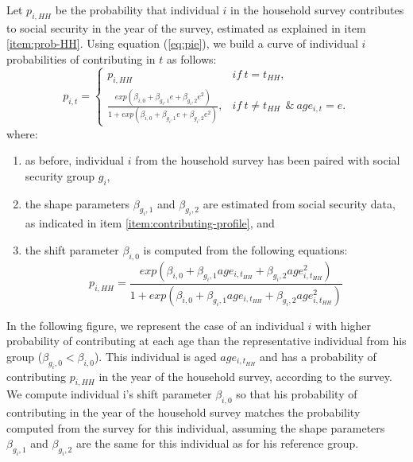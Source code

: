 \documentclass{article}
\begin{document}
\begin{enumerate}
    Let $p_{i,HH}$ be the probability that individual $i$ in the household survey contributes to social security in the year of the survey, estimated as explained in item \ref{item:prob-HH}. Using equation (\ref{eq:pie}), we build a curve of individual $i$ probabilities of contributing in $t$ as follows:
    \begin{equation}
        p_{i,t}= \left\{\begin{array}{ll}
            p_{i,HH} & if \ t = t_{HH}, \\
            \frac{exp(\beta_{i,0} +\beta_{g_i,1} e+\beta_{g_i,2} e^2)}{1+ exp(\beta_{i,0} +\beta_{g_i,1} e+\beta_{g_i,2} e^2)},&  if  \ t \neq t_{HH} \ \ \& \ age_{i,t}=e. 
        \end{array} \right .
    \end{equation}
    where: 
    \begin{enumerate}
        \item as before, individual $i$ from the household survey has been paired with social security group $g_i$,
        \item the shape parameters $\beta_{g_i,1}$ and $\beta_{g_i,2}$ are estimated from social security data, as indicated in item \ref{item:contributing-profile}, and
        \item the shift parameter $\beta_{i,0}$ is computed from the following equations: 
        \begin{equation} \label{eq:piHH}
         p_{i,HH}=\frac{exp(\beta_{i,0} +\beta_{g_i,1} age_{i,t_{HH}}+\beta_{g_i,2} age_{i,t_{HH}}^2)}{1+ exp(\beta_{i,0} +\beta_{g_i,1} age_{i,t_{HH}}+\beta_{g_i,2} age_{i,t_{HH}}^2)}
         \end{equation}
    \end{enumerate}

In the following figure, we represent the case of an individual $i$ with higher probability of contributing at each age than the representative individual from his group ($\beta_{g_i,0} <\beta_{i,0}$). This individual is aged $age_{i,t_{HH}}$ and has a probability of contributing $p_{i,HH}$ in the year of the household survey, according to the survey. We compute individual i's shift parameter $\beta_{i,0}$ so that his probability of contributing in the year of the household survey matches the probability computed from the survey for this individual, assuming the shape parameters $\beta_{g_i,1}$ and $\beta_{g_i,2}$ are the same for this individual as for his reference group.  


\end{enumerate}
\end{document}
